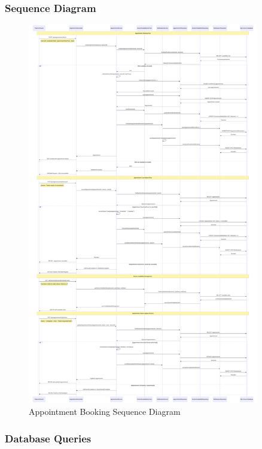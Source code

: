 \documentclass[12pt,a4paper]{article}
\begin{document}
\subsubsection{Sequence Diagram}

\begin{figure}[H]
\centering
\includegraphics[width=0.9\textwidth]{diagrams/appointment_booking_sequence.svg}
\caption{Appointment Booking Sequence Diagram}
\label{fig:appointment-sequence}
\end{figure}

\subsubsection{Database Queries}
\end{document}
